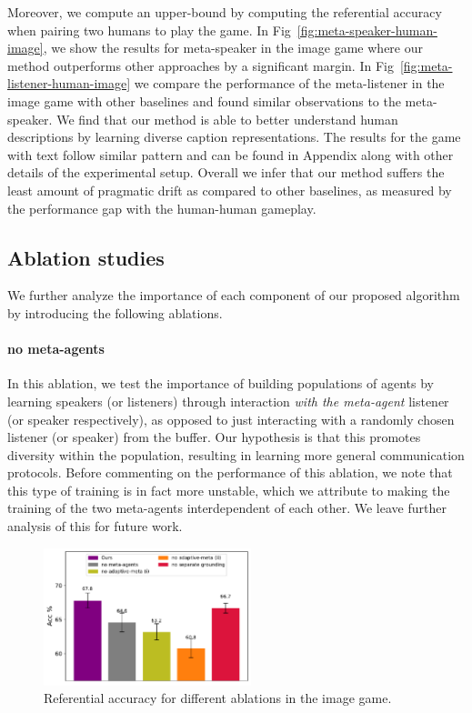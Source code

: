 \documentclass{article}
\begin{document}
Moreover, we compute an upper-bound by computing the referential accuracy when pairing two humans to play the game. In Fig~\ref{fig:meta-speaker-human-image}, we show the results for meta-speaker in the image game where our method outperforms other approaches by a significant margin. In Fig~\ref{fig:meta-listener-human-image} we compare the performance of the meta-listener in the image game with other baselines and found similar observations to the meta-speaker. We find that our method is able to better understand human descriptions by learning diverse caption representations. The results for the game with text follow similar pattern and can be found in Appendix along with other details of the experimental setup. Overall we infer that our method suffers the least amount of pragmatic drift as compared to other baselines, as measured by the performance gap with the human-human gameplay.

\subsection{Ablation studies}
\label{subsec:ablation}
We further analyze the importance of each component of our proposed algorithm by introducing the following ablations.

\paragraph{no meta-agents} 
In this ablation, we test the importance of building populations of agents by learning speakers (or listeners) through interaction \textit{with the meta-agent} listener (or speaker respectively), as opposed to just interacting with a randomly chosen listener (or speaker) from the buffer. Our hypothesis is that this promotes diversity within the population, resulting in learning more general communication protocols. Before commenting on the performance of this ablation, we note that this type of training is in fact more unstable, which we attribute to making the training of the two meta-agents interdependent of each other. We leave further analysis of this for future work.

\begin{figure}
    \centering
    \includegraphics[width=0.98\linewidth, height=4cm]{figs/ablation-acc-image.pdf}
    \caption{Referential accuracy for different ablations in the image game.\label{fig:listener-ablation}}
\end{figure}
\end{document}
